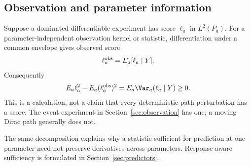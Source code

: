 \subsection{Observation and parameter information}
Suppose a dominated differentiable experiment has score $\ell_a$ in $L^2(P_a)$. For a parameter-independent observation kernel or statistic, differentiation under a common envelope gives observed score
\[
 \ell_a^{\rm obs}=E_a[\ell_a\mid Y].
\]
Consequently
\begin{equation}
 E_a\ell_a^2-E_a(\ell_a^{\rm obs})^2
 =E_a\Var_a(\ell_a\mid Y)\ge0.
 \label{eq:fisher-loss}
\end{equation}
This is a calculation, not a claim that every deterministic path perturbation has a score. The event experiment in Section~\ref{sec:observation} has one; a moving Dirac path generally does not.

The same decomposition explains why a statistic sufficient for prediction at one parameter need not preserve derivatives across parameters. Response-aware sufficiency is formulated in Section~\ref{sec:predictors}.
\par
